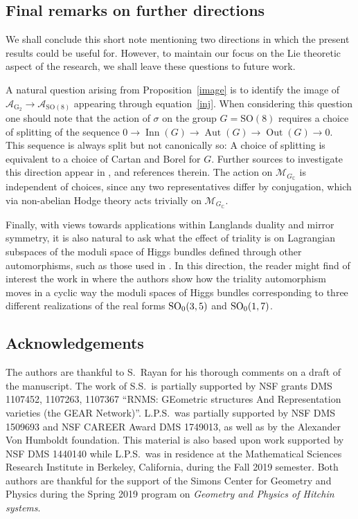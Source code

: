 \documentclass[10pt,a4paper]{amsart}
\numberwithin{equation}{section}
\newcommand{\SO}{{\mathrm{SO}}}
\begin{document}
\subsection{Final remarks on further directions}\label{sec:final}
We shall conclude this short note mentioning two directions in which the present results could be useful for. However, to maintain our focus on the Lie theoretic aspect of the research, we shall leave these questions to future work.

 A natural question arising from Proposition~\ref{image} is to identify the image of $\mathcal{A}_{\mathrm{G}_2} \rightarrow \mathcal{A}_{\SO(8)}$ appearing through equation~\eqref{inj}.
When considering this question one should note that the action of $\sigma$ on the group $G=\SO(8)$ requires a choice of splitting of the sequence $0 \rightarrow \operatorname{Inn}(G) \rightarrow \operatorname{Aut}(G) \rightarrow \operatorname{Out}(G) \rightarrow 0$.
 This sequence is always split but not canonically so: A choice of splitting is equivalent to a choice of Cartan and Borel for $G$. Further sources to investigate this direction appear in \cite{anton, oscar}, and references therein. The action on $\mathcal{M}_{G_\mathbb{C}}$ is independent of choices, since any two representatives differ by conjugation, which via non-abelian Hodge theory acts trivially on $\mathcal{M}_{G_\mathbb{C}}$.

 Finally, with views towards applications within Langlands duality and mirror symmetry, it is also natural to ask what the effect of triality is on Lagrangian subspaces of the moduli space of Higgs bundles defined through other automorphisms, such as those used in \cite{slices,cmc}.
In this direction, the reader might find of interest the work in \cite[Section~10]{oscar} where the authors show how the triality automorphism moves in a cyclic way the moduli spaces of Higgs bundles corresponding to three different realizations of the real forms ${\rm SO}_0(3,5)$ and ${\rm SO}_0(1,7)$.

\subsection*{Acknowledgements}
The authors are thankful to S.~Rayan for his thorough comments on a draft of the manuscript. The work of S.S.\ is partially supported by NSF grants DMS 1107452, 1107263, 1107367 ``RNMS: GEometric structures And Representation varieties (the GEAR Network)''.
 L.P.S.\ was partially supported by NSF DMS 1509693 and NSF CAREER Award DMS 1749013, as well as by the Alexander Von Humboldt foundation. This material is also based upon work supported by NSF DMS 1440140 while L.P.S.\ was in residence at the Mathematical Sciences
Research Institute in Berkeley, California, during the Fall 2019 semester. Both authors are thankful for the support of the Simons Center for Geometry and Physics during the Spring 2019 program on {\it Geometry and Physics of Hitchin systems}.
\end{document}
